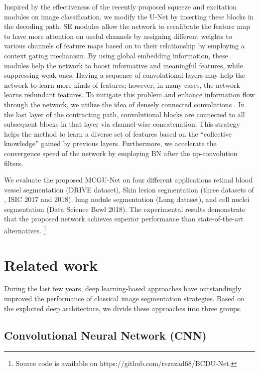 \documentclass[journal]{IEEEtran}
\begin{document}
Inspired by the effectiveness of the recently proposed squeeze and excitation modules \cite{hu2018squeeze} on image classification, we modify the U-Net by inserting these blocks in the decoding path. SE modules allow the network to  recalibrate the feature map to have more attention on useful channels by assigning different weights to various channels of feature maps based on to their relationship by employing a context gating mechanism. By using global embedding information, these modules help the network to boost informative and meaningful features, while suppressing weak ones. 
Having a sequence of convolutional layers may help the network to learn more kinds of features; however, in many cases, the network learns redundant features. To mitigate this problem and enhance information flow through the network, we utilize the idea of densely connected convolutions \cite{huang2017densely}. In the last layer of the contracting path, convolutional blocks are connected to all subsequent blocks in that layer via channel-wise concatenation. This strategy helps the method to learn a diverse set of features based on the “collective knowledge” gained by previous layers. Furthermore, we accelerate the convergence speed of the network by employing BN after the up-convolution filters.






We evaluate the proposed MCGU-Net on four different applications retinal blood vessel segmentation (DRIVE dataset), Skin lesion segmentation (three datasets of , ISIC 2017 and 2018), lung nodule segmentation (Lung dataset), and cell nuclei segmentation (Data Science Bowl 2018). The experimental results demonstrate that the proposed network achieves superior performance than state-of-the-art alternatives. \footnote{Source code is available on https://github.com/rezazad68/BCDU-Net.}

\section{Related work}
During the last few years, deep learning-based approaches have outstandingly improved the performance of classical image segmentation strategies. Based on the exploited deep architecture, we divide these approaches into three groups. 

\subsection{Convolutional Neural Network (CNN)}
\end{document}

